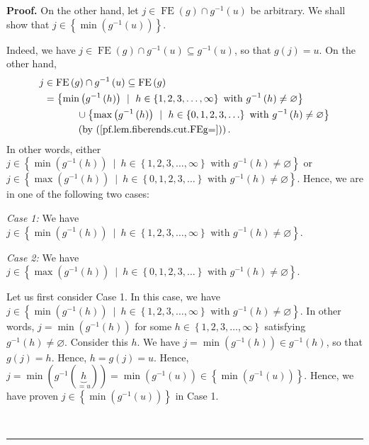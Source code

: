 \documentclass[numbers=enddot,12pt,final,onecolumn,notitlepage]{scrartcl}%
\theoremstyle{definition}
\newenvironment{proof}[1][Proof]{\noindent\textbf{#1.} }{\ \rule{0.5em}{0.5em}}
\newenvironment{verlong}{}{}
\begin{document}
\begin{verlong}
\begin{proof}
On the other hand, let $j\in\operatorname*{FE}\left(  g\right)  \cap
g^{-1}\left(  u\right)  $ be arbitrary. We shall show that $j\in\left\{
\min\left(  g^{-1}\left(  u\right)  \right)  \right\}  $.

Indeed, we have $j\in\operatorname*{FE}\left(  g\right)  \cap g^{-1}\left(
u\right)  \subseteq g^{-1}\left(  u\right)  $, so that $g\left(  j\right)
=u$. On the other hand,%
\begin{align*}
j  &  \in\operatorname*{FE}\left(  g\right)  \cap g^{-1}\left(  u\right)
\subseteq\operatorname*{FE}\left(  g\right) \\
&  =\left\{  \min\left(  g^{-1}\left(  h\right)  \right)  \ \mid\ h\in\left\{
1,2,3,\ldots,\infty\right\}  \text{ with }g^{-1}\left(  h\right)
\neq\varnothing\right\} \\
&  \ \ \ \ \ \ \ \ \ \ \cup\left\{  \max\left(  g^{-1}\left(  h\right)
\right)  \ \mid\ h\in\left\{  0,1,2,3,\ldots\right\}  \text{ with }%
g^{-1}\left(  h\right)  \neq\varnothing\right\} \\
&  \ \ \ \ \ \ \ \ \ \ \left(  \text{by (\ref{pf.lem.fiberends.cut.FEg=}%
)}\right)  .
\end{align*}
In other words, either $j\in\left\{  \min\left(  g^{-1}\left(  h\right)
\right)  \ \mid\ h\in\left\{  1,2,3,\ldots,\infty\right\}  \text{ with }%
g^{-1}\left(  h\right)  \neq\varnothing\right\}  $ or $j\in\left\{
\max\left(  g^{-1}\left(  h\right)  \right)  \ \mid\ h\in\left\{
0,1,2,3,\ldots\right\}  \text{ with }g^{-1}\left(  h\right)  \neq
\varnothing\right\}  $. Hence, we are in one of the following two cases:

\textit{Case 1:} We have $j\in\left\{  \min\left(  g^{-1}\left(  h\right)
\right)  \ \mid\ h\in\left\{  1,2,3,\ldots,\infty\right\}  \text{ with }%
g^{-1}\left(  h\right)  \neq\varnothing\right\}  $.

\textit{Case 2:} We have $j\in\left\{  \max\left(  g^{-1}\left(  h\right)
\right)  \ \mid\ h\in\left\{  0,1,2,3,\ldots\right\}  \text{ with }%
g^{-1}\left(  h\right)  \neq\varnothing\right\}  $.

Let us first consider Case 1. In this case, we have \newline$j\in\left\{
\min\left(  g^{-1}\left(  h\right)  \right)  \ \mid\ h\in\left\{
1,2,3,\ldots,\infty\right\}  \text{ with }g^{-1}\left(  h\right)
\neq\varnothing\right\}  $. In other words, $j=\min\left(  g^{-1}\left(
h\right)  \right)  $ for some $h\in\left\{  1,2,3,\ldots,\infty\right\}  $
satisfying $g^{-1}\left(  h\right)  \neq\varnothing$. Consider this $h$. We
have $j=\min\left(  g^{-1}\left(  h\right)  \right)  \in g^{-1}\left(
h\right)  $, so that $g\left(  j\right)  =h$. Hence, $h=g\left(  j\right)
=u$. Hence, $j=\min\left(  g^{-1}\left(  \underbrace{h}_{=u}\right)  \right)
=\min\left(  g^{-1}\left(  u\right)  \right)  \in\left\{  \min\left(
g^{-1}\left(  u\right)  \right)  \right\}  $. Hence, we have proven
$j\in\left\{  \min\left(  g^{-1}\left(  u\right)  \right)  \right\}  $ in Case 1.


\end{proof}
\end{verlong}
\end{document}
